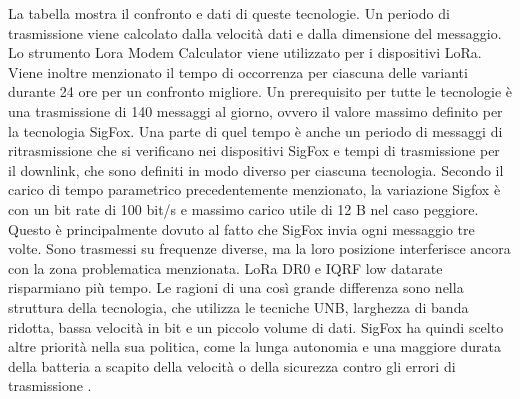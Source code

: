 \documentclass[a4paper]{report} %
\begin{document}
La tabella mostra il confronto e dati di queste tecnologie. Un periodo di trasmissione viene calcolato dalla velocità dati e dalla dimensione del messaggio. Lo strumento Lora Modem Calculator viene utilizzato per i dispositivi LoRa. Viene inoltre menzionato il tempo di occorrenza per ciascuna delle varianti durante 24 ore per un confronto migliore. Un prerequisito per tutte le tecnologie è una trasmissione di 140 messaggi al giorno, ovvero il valore massimo definito per la tecnologia SigFox. Una parte di quel tempo è anche un periodo di messaggi di ritrasmissione che si verificano nei dispositivi SigFox e tempi di trasmissione per il downlink, che sono definiti in modo diverso per ciascuna tecnologia. Secondo il carico di tempo parametrico precedentemente menzionato, la variazione Sigfox è con un bit rate di 100 bit/s e massimo carico utile di 12 B nel caso peggiore. Questo è principalmente dovuto al fatto che SigFox invia ogni messaggio tre volte. Sono trasmessi su frequenze diverse, ma la loro posizione interferisce ancora con la zona problematica menzionata. LoRa DR0 e IQRF low datarate risparmiano più tempo. Le ragioni di una così grande differenza sono nella struttura della tecnologia, che utilizza le tecniche UNB, larghezza di banda ridotta, bassa velocità in bit e un piccolo volume di dati. SigFox ha quindi scelto altre priorità nella sua politica, come la lunga autonomia e una maggiore durata della batteria a scapito della velocità o della sicurezza contro gli errori di trasmissione \cite{art:rif.46}.
\end{document}
